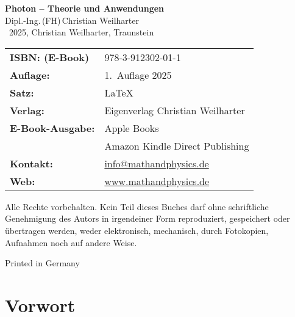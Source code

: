 
\thispagestyle{empty}
\begin{center}


{\Large\textbf{Photon – Theorie und Anwendungen}}\\[1.2em]
{\large Dipl.-Ing.\,(FH)\,Christian Weilharter}\\[1.2em]
\textcopyright~2025, Christian Weilharter, Traunstein\\[2em]
\end{center}
\begin{flushleft}
	\begin{tabular}{@{}l l}
	
	
	
		\textbf{ISBN: (E-Book)} & 978-3-912302-01-1 \\[0.5em]
		\textbf{Auflage:} & 1.~Auflage 2025 \\[0.5em]
		\textbf{Satz:} & \LaTeX \\[0.5em]
		\textbf{Verlag:} & Eigenverlag Christian Weilharter\\[0.5em]
		\textbf{E-Book-Ausgabe:} & Apple Books\\[0.5em]
		&Amazon Kindle Direct Publishing \\[0.5em]
	
	
		
	\textbf{Kontakt:} & \href{mailto:info@mathandphysics.de}{info@mathandphysics.de}\\[0.5em]
	\textbf{Web:} & \href{https://www.mathandphysics.de}{www.mathandphysics.de}\\
	

	\end{tabular}
\end{flushleft}



Alle Rechte vorbehalten. Kein Teil dieses Buches darf ohne schriftliche Genehmigung des Autors 
in irgendeiner Form reproduziert, gespeichert oder übertragen werden, 
weder elektronisch, mechanisch, durch Fotokopien, Aufnahmen noch auf andere Weise.
\begin{center}\small Printed in Germany\end{center}



\chapter*{Vorwort}



